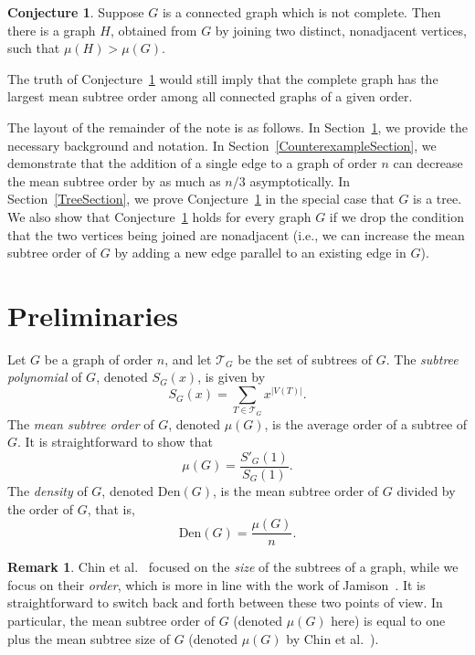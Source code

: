 \documentclass[12pt]{article}
\newcommand{\den}{\mbox{Den}}
\theoremstyle{definition}
\newtheorem{remark}[theorem]{Remark}
\newtheorem{conjecture}[theorem]{Conjecture}
\begin{document}
\begin{conjecture}\label{AddConjecture}
Suppose $G$ is a connected graph which is not complete. Then there is a graph $H$, obtained from $G$ by joining two distinct, nonadjacent vertices, such that $\mu(H)>\mu(G).$
\end{conjecture}

\noindent
The truth of Conjecture~\ref{AddConjecture} would still imply that the complete graph has the largest mean subtree order among all connected graphs of a given order.

The layout of the remainder of the note is as follows.  In Section~\ref{PrelimSection}, we provide the necessary background and notation.  In Section~\ref{CounterexampleSection}, we demonstrate that the addition of a single edge to a graph of order $n$ can decrease the mean subtree order by as much as $n/3$ asymptotically.  In Section~\ref{TreeSection}, we prove Conjecture~\ref{AddConjecture} in the special case that $G$ is a tree.  We also show that Conjecture~\ref{AddConjecture} holds for every graph $G$ if we drop the condition that the two vertices being joined are nonadjacent (i.e., we can increase the mean subtree order of $G$ by adding a new edge parallel to an existing edge in $G$).

\section{Preliminaries}\label{PrelimSection}

Let $G$ be a graph of order $n$, and let $\mathcal{T}_G$ be the set of subtrees of $G$.  The \emph{subtree polynomial} of $G$, denoted $S_G(x)$, is given by
\[
S_G(x)=\sum_{T\in\mathcal{T}_G}x^{|V(T)|}.
\]
The \emph{mean subtree order} of $G$, denoted $\mu(G)$, is the average order of a subtree of $G$.  It is straightforward to show that
\[
\mu(G)=\frac{S'_G(1)}{S_G(1)}.
\]
The \emph{density} of $G$, denoted $\den(G)$, is the mean subtree order of $G$ divided by the order of $G$, that is,
\[
\den(G)=\frac{\mu(G)}{n}.
\]

\begin{remark}
Chin et al.~\cite{ChinGordonMacpheeVincent2018} focused on the \emph{size} of the subtrees of a graph, while we focus on their \emph{order}, which is more in line with the work of Jamison~\cite{Jamison1983}.  It is straightforward to switch back and forth between these two points of view.  In particular, the mean subtree order of $G$ (denoted $\mu(G)$ here) is equal to one plus the mean subtree size of $G$ (denoted $\mu(G)$ by Chin et al.~\cite{ChinGordonMacpheeVincent2018}).  
\end{remark}
\end{document}
